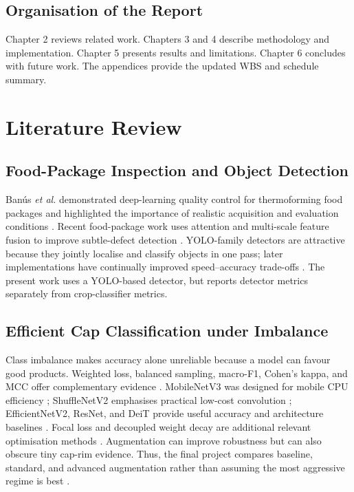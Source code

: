 \documentclass[12pt,a4paper]{report}
\begin{document}
\section{Organisation of the Report}
Chapter 2 reviews related work. Chapters 3 and 4 describe methodology and implementation. Chapter 5 presents results and limitations. Chapter 6 concludes with future work. The appendices provide the updated WBS and schedule summary.

\chapter{Literature Review}
\section{Food-Package Inspection and Object Detection}
Ban\'us \emph{et al.} demonstrated deep-learning quality control for thermoforming food packages and highlighted the importance of realistic acquisition and evaluation conditions \cite{banus2021}. Recent food-package work uses attention and multi-scale feature fusion to improve subtle-defect detection \cite{liu2025}. YOLO-family detectors are attractive because they jointly localise and classify objects in one pass; later implementations have continually improved speed--accuracy trade-offs \cite{redmon2018,wang2022,jocher2023}. The present work uses a YOLO-based detector, but reports detector metrics separately from crop-classifier metrics.

\section{Efficient Cap Classification under Imbalance}
Class imbalance makes accuracy alone unreliable because a model can favour good products. Weighted loss, balanced sampling, macro-F1, Cohen's kappa, and MCC offer complementary evidence \cite{buda2018,cui2019,chicco2020,cohen1960}. MobileNetV3 was designed for mobile CPU efficiency \cite{howard2019}; ShuffleNetV2 emphasises practical low-cost convolution \cite{ma2018}; EfficientNetV2, ResNet, and DeiT provide useful accuracy and architecture baselines \cite{tan2021,he2016,touvron2021}. Focal loss and decoupled weight decay are additional relevant optimisation methods \cite{lin2017,loshchilov2019}. Augmentation can improve robustness but can also obscure tiny cap-rim evidence. Thus, the final project compares baseline, standard, and advanced augmentation rather than assuming the most aggressive regime is best \cite{zhang2018,yun2019}.
\end{document}
